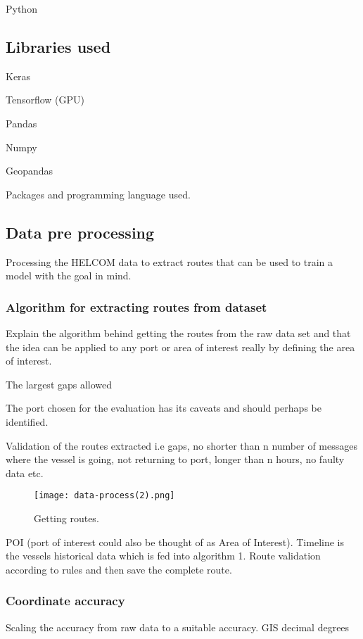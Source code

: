 \documentclass[../main.tex]{subfiles}
\begin{document}
Python
\subsection{Libraries used}

Keras

Tensorflow (GPU)

Pandas

Numpy

Geopandas

Packages and programming language used.


\subsection{Data pre processing}

Processing the HELCOM data to extract routes that can be used to train a model with the goal in mind.


\subsubsection{Algorithm for extracting routes from dataset}

Explain the algorithm behind getting the routes from the raw data set and that the idea can be applied to any port or area of interest really by defining the area of interest.

The largest gaps allowed

The port chosen for the evaluation has its caveats and should perhaps be identified.

Validation of the routes extracted i.e gaps, no shorter than n number of messages where the vessel is going, not returning to port, longer than n hours, no faulty data etc.

\begin{figure}[H]
	\centering
	\texttt{[image: data-process(2).png]}
	\caption{Getting routes.}
	\label{fig:flowchart}
\end{figure}

POI (port of interest could also be thought of as Area of Interest). Timeline is the vessels historical data which is fed into algorithm 1. Route validation according to rules and then save the complete route.

\subsubsection{Coordinate accuracy}

Scaling the accuracy from raw data to a suitable accuracy. GIS decimal degrees
\end{document}
